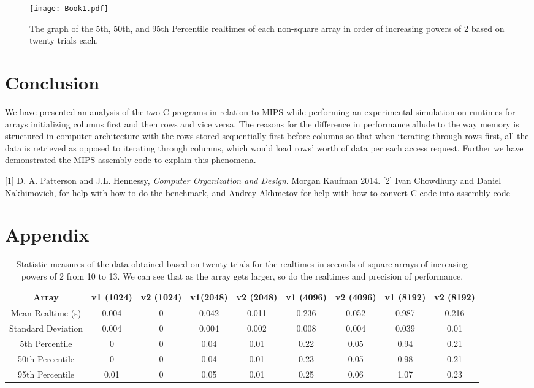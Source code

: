 \documentclass[a4paper]{article}
\begin{document}
\begin{figure}[H]
\centering
\texttt{[image: Book1.pdf]}
\caption{\label{fig:bashscript}The graph of the 5th, 50th, and 95th Percentile realtimes of each non-square array in order of increasing powers of 2 based on twenty trials each.}
\end{figure}

\section{Conclusion}
We have presented an analysis of the two C programs in relation to MIPS while performing an experimental simulation on runtimes for arrays initializing columns first and then rows and vice versa. The reasons for the difference in performance allude to the way memory is structured in computer architecture with the rows stored sequentially first before columns so that when iterating through rows first, all the data is retrieved as opposed to iterating through columns, which would load rows’ worth of data per each access request. Further we have demonstrated the MIPS assembly code to explain this phenomena. 

\newpage


[1] D. A. Patterson and J.L. Hennessy, \textit{Computer Organization and Design}. Morgan Kaufman 2014.
\linebreak
{[2]} Ivan Chowdhury and Daniel Nakhimovich, for help with how to do the benchmark, and Andrey Akhmetov for help with how to convert C code into assembly code

\newpage
\appendix
\section{Appendix}

\begin{table}[H]
\centering
\begin{tabular}{|c|c|c|c|c|c|c|c|c|}
\hline
Array & v1 (1024) & v2 (1024) & v1(2048) & v2 (2048) & v1 (4096) & v2 (4096) & v1 (8192) & v2 (8192)\\\hline
Mean Realtime (s) & 0.004 & 0 & 0.042 & 0.011 & 0.236 & 0.052 & 0.987 & 0.216 \\\hline
Standard Deviation & 0.004 & 0 & 0.004 & 0.002 & 0.008 & 0.004 & 0.039 & 0.01 \\\hline
5th Percentile & 0 & 0 & 0.04 & 0.01 & 0.22 & 0.05 & 0.94 & 0.21 \\\hline
50th Percentile & 0 & 0 & 0.04 & 0.01 & 0.23 & 0.05 & 0.98 & 0.21 \\\hline
95th Percentile & 0.01 & 0 & 0.05 & 0.01 & 0.25 & 0.06 & 1.07 & 0.23 \\\hline
\end{tabular}
\caption{\label{tab:widgets}Statistic measures of the data obtained based on twenty trials for the realtimes in seconds of square arrays of increasing powers of 2 from 10 to 13. We can see that as the array gets larger, so do the realtimes and precision of performance.}
\end{table}
\end{document}
